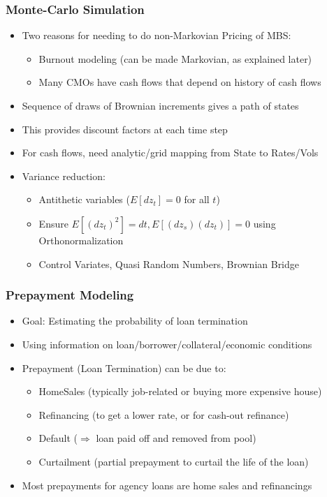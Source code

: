 \documentclass{beamer}
\begin{document}
\begin{frame}
\frametitle{Monte-Carlo Simulation}
\begin{itemize}
\item Two reasons for needing to do non-Markovian Pricing of MBS:
\begin{itemize}
\item Burnout modeling (can be made Markovian, as explained later)
\item Many CMOs have cash flows that depend on history of cash flows
\end{itemize}
\item Sequence of draws of Brownian increments gives a path of states 
\item This provides discount factors at each time step
\item For cash flows, need analytic/grid mapping from State to Rates/Vols
\item Variance reduction:
\begin{itemize}
\item Antithetic variables ($E[dz_t] = 0$ for all $t$)
\item Ensure $E[(dz_t)^2] = dt, E[(dz_s)(dz_t)] = 0$ using Orthonormalization
\item Control Variates, Quasi Random Numbers, Brownian Bridge
\end{itemize}
\end{itemize}
\end{frame}


\begin{frame}
\frametitle{Prepayment Modeling}
\begin{itemize}
\item Goal: Estimating the probability of loan termination
\item Using information on loan/borrower/collateral/economic conditions
\item Prepayment (Loan Termination) can be due to:
\begin{itemize}
\item HomeSales (typically job-related or buying more expensive house)
\item Refinancing (to get a lower rate, or for cash-out refinance)
\item Default ($\Rightarrow$ loan paid off and removed from pool)
\item Curtailment (partial prepayment to curtail the life of the loan)
\end{itemize}
\item Most prepayments for agency loans are home sales and refinancings
\end{itemize}
\end{frame}
\end{document}
